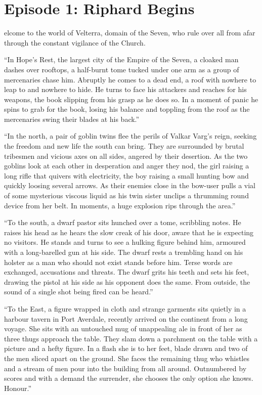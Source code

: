 \section{Episode 1: Riphard Begins}
\begin{multicols}{2}
\medskip

elcome to the world of Velterra, domain of the Seven, who rule over all from afar through the constant vigilance of the Church.\medskip

“In Hope’s Rest, the largest city of the Empire of the Seven, a cloaked man dashes over rooftops, a half-burnt tome tucked under one arm as a group of mercenaries chase him. Abruptly he comes to a dead end, a roof with nowhere to leap to and nowhere to hide. He turns to face his attackers and reaches for his weapons, the book slipping from his grasp as he does so. In a moment of panic he spins to grab for the book, losing his balance and toppling from the roof as the mercenaries swing their blades at his back.”\medskip

“In the north, a pair of goblin twins flee the perils of Valkar Varg’s reign, seeking the freedom and new life the south can bring. They are surrounded by brutal tribesmen and vicious axes on all sides, angered by their desertion. As the two goblins look at each other in desperation and anger they nod, the girl raising a long rifle that quivers with electricity, the boy raising a small hunting bow and quickly loosing several arrows. As their enemies close in the bow-user pulls a vial of some mysterious viscous liquid as his twin sister unclips a thrumming round device from her belt. In moments, a huge explosion rips through the area.”\medskip

“To the south, a dwarf pastor sits hunched over a tome, scribbling notes. He raises his head as he hears the slow creak of his door, aware that he is expecting no visitors. He stands and turns to see a hulking figure behind him, armoured with a long-barelled gun at his side. The dwarf rests a trembling hand on his holster as a man who should not exist stands before him. Terse words are exchanged, accusations and threats. The dwarf grits his teeth and sets his feet, drawing the pistol at his side as his opponent does the same. From outside, the sound of a single shot being fired can be heard.”\medskip

“To the East, a figure wrapped in cloth and strange garments sits quietly in a harbour tavern in Port Averdale, recently arrived on the continent from a long voyage. She sits with an untouched mug of unappealing ale in front of her as three thugs approach the table. They slam down a parchment on the table with a picture and a hefty figure. In a flash she is to her feet, blade drawn and two of the men sliced apart on the ground. She faces the remaining thug who whistles and a stream of men pour into the building from all around. Outnumbered by scores and with a demand the surrender, she chooses the only option she knows. Honour.”\medskip


\end{multicols}
